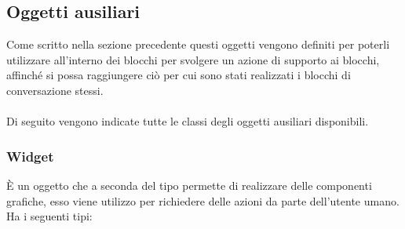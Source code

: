 \subsection{Oggetti ausiliari}
Come scritto nella sezione precedente questi oggetti vengono definiti per poterli utilizzare all'interno dei blocchi per svolgere un azione di supporto ai blocchi, affinché si possa raggiungere ciò per cui sono stati realizzati i blocchi di conversazione stessi.\\
\\
Di seguito vengono indicate tutte le classi degli oggetti ausiliari disponibili.

\subsubsection*{Widget}
È un oggetto che a seconda del tipo permette di realizzare delle componenti grafiche, esso viene utilizzo per richiedere delle azioni da parte dell’utente umano.
Ha i seguenti tipi:
